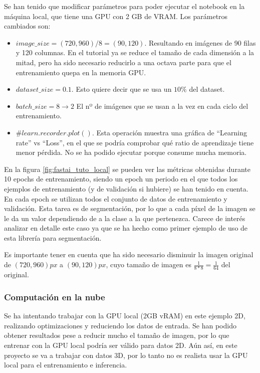 Se han tenido que modificar parámetros para poder ejecutar el notebook en la máquina local, que tiene una GPU con 2 GB de VRAM. Los parámetros cambiados son:
\begin{itemize}
\item $image\_size = (720, 960) / 8 = (90, 120)$. Resultando en imágenes de 90 filas y 120 columnas. En el tutorial ya se reduce el tamaño de cada dimensión a la mitad, pero ha sido necesario reducirlo a una octava parte para que el entrenamiento quepa en la memoria GPU.
\item $dataset\_size = 0.1$. Esto quiere decir que se usa un $10\%$ del dataset.
\item $batch\_size = 8 \rightarrow 2$ El nº de imágenes que se usan a la vez en cada ciclo del entrenamiento.
\item $\#learn.recorder.plot()$. Esta operación muestra una gráfica de “Learning rate” vs “Loss”, en el que se podría comprobar qué ratio de aprendizaje tiene menor pérdida. No se ha podido ejecutar porque consume mucha memoria.
\end{itemize}


En la figura \ref{fig:fastai_tuto_local} se pueden ver las métricas obtenidas durante 10 epochs de entrenamiento, siendo un epoch un periodo en el que todos los ejemplos de entrenamiento (y de validación si hubiere) se han tenido en cuenta. En cada epoch se utilizan todos el conjunto de datos de entrenamiento y validación. Esta tarea es de segmentación, por lo que a cada píxel de la imagen se le da un valor dependiendo de a la clase a la que pertenezca. Carece de interés analizar en detalle este caso ya que se ha hecho como primer ejemplo de uso de esta librería para segmentación.

Es importante tener en cuenta que ha sido necesario disminuir la imagen original de $(720, 960)px$ a $(90, 120)px$, cuyo tamaño de imagen es $\frac{1}{8*8}=\frac{1}{64}$ del original.

\subsubsection{Computación en la nube}\label{sec:cloud_dev}

Se ha intentando trabajar con la GPU local (2GB vRAM) en este ejemplo 2D, realizando optimizaciones y reduciendo los datos de entrada. Se han podido obtener resultados pese a reducir mucho el tamaño de imagen, por lo que entrenar con la GPU local podría ser válido para datos 2D. Aún así, en este proyecto se va a trabajar con datos 3D, por lo tanto no es realista usar la GPU local para el entrenamiento e inferencia.

